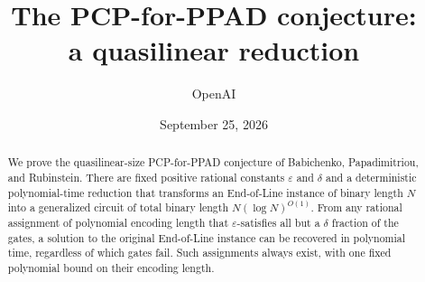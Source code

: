 \documentclass[11pt]{article}
\title{The PCP-for-PPAD conjecture:\\a quasilinear reduction}
\author{OpenAI}
\date{September 25, 2026}
\numberwithin{equation}{section}
\theoremstyle{definition}
\theoremstyle{remark}
\newcommand{\eps}{\varepsilon}
\begin{document}
\maketitle
\begin{abstract}
We prove the quasilinear-size PCP-for-PPAD conjecture of Babichenko,
Papadimitriou, and Rubinstein. There are fixed positive rational constants
$\eps$ and $\delta$ and a deterministic polynomial-time reduction that
transforms an End-of-Line instance of binary length $N$ into a generalized
circuit of total binary length $N(\log N)^{O(1)}$. From any rational
assignment of polynomial encoding length that $\eps$-satisfies all but a
$\delta$ fraction of the gates, a solution to the original End-of-Line
instance can be recovered in polynomial time, regardless of which gates
fail. Such assignments always exist, with one fixed polynomial bound on
their encoding length.
\end{abstract}
\tableofcontents











\appendix

{}


\end{document}
